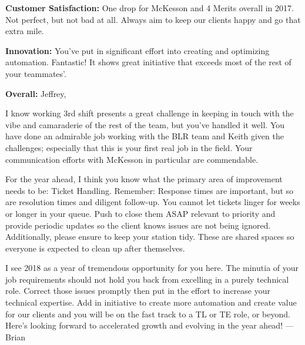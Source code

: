 


\begin{cvparagraph}
\end{cvparagraph}

\begin{cvparagraph}
    {\bfseries Customer Satisfaction:} One drop for McKesson and 4 Merits overall in 2017. 
    Not perfect, but not bad at all. 
    Always aim to keep our clients happy and go that extra mile.

    {\bfseries Innovation:} You've put in significant effort into creating and optimizing automation. 
    Fantastic! 
    It shows great initiative that exceeds most of the rest of your teammates'.

    {\bfseries Overall:}
Jeffrey,

I know working 3rd shift presents a great challenge in keeping in touch with the vibe and camaraderie of the rest of the team, but you've handled it well.
You have done an admirable job working with the BLR team and Keith given the challenges; especially that this is your first real job in the field.
Your communication efforts with McKesson in particular are commendable.

For the year ahead, I think you know what the primary area of improvement needs to be: Ticket Handling.
Remember: Response times are important, but so are resolution times and diligent follow-up.
You cannot let tickets linger for weeks or longer in your queue.
Push to close them ASAP relevant to priority and provide periodic updates so the client knows issues are not being ignored.
Additionally, please ensure to keep your station tidy.
These are shared spaces so everyone is expected to clean up after themselves.

I see 2018 as a year of tremendous opportunity for you here.
The minutia of your job requirements should not hold you back from excelling in a purely technical role.
Correct those issues promptly then put in the effort to increase your technical expertise.
Add in initiative to create more automation and create value for our clients and you will be on the fast track to a TL or TE role, or beyond.
Here's looking forward to accelerated growth and evolving in the year ahead!
---Brian
\end{cvparagraph}

